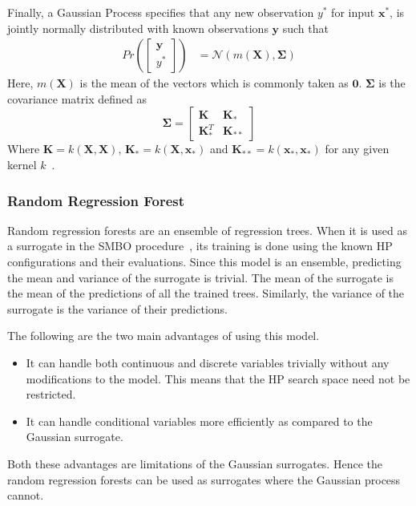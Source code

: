 \documentclass[12pt, twoside, ngerman]{report}
\begin{document}
Finally,  a Gaussian Process specifies that any new observation $y^*$ for input $\textbf{x}^*$,  is jointly normally distributed with known observations $\textbf{y}$ such that
\begin{align}
    Pr\left( \begin{bmatrix}
           \textbf{y} \\
           y^*
         \end{bmatrix}
         \right)
         &=  \mathcal{N}\left(m(\textbf{X}), \mathbf{\Sigma}\right)
\end{align}
Here, $m(\textbf{X})$ is the mean of the vectors which is commonly taken as $\textbf{0}$.
$\mathbf{\Sigma}$ is the covariance matrix defined as
$$
\mathbf{\Sigma} = \begin{bmatrix}
           \textbf{K} & \textbf{K}_* \\
           \textbf{K}_*^T & \textbf{K}_{**}
         \end{bmatrix}
$$
  Where $\textbf{K} = k(\textbf{X}, \textbf{X})$,  $\textbf{K}_*  =  k(\textbf{X}, \textbf{x}_*)$ and $\textbf{K}_{**} = k(\textbf{x}_*,  \textbf{x}_*)$ for any given kernel $k$~\cite{GPTutorial}.

\subsubsection{Random Regression Forest}
Random regression forests are an ensemble of regression trees.
When it is used as a surrogate in the SMBO procedure~\cite{SMBOPaper},  its training is done using the known HP configurations and their evaluations.
Since this model is an ensemble, predicting the mean and variance of the surrogate is trivial. The mean of the surrogate is the mean of the predictions of all the trained trees. Similarly, the variance of the surrogate is the variance of their predictions.

The following are the two main advantages of using this model.
\begin{itemize}
\item It can handle both continuous and discrete variables trivially without any modifications to the model. This means that the HP search space need not be restricted.
\item It can handle conditional variables more efficiently as compared to the Gaussian surrogate.
\end{itemize}

Both these advantages are limitations of the Gaussian surrogates. Hence the random regression forests can be used as surrogates where the Gaussian process cannot.
\end{document}
